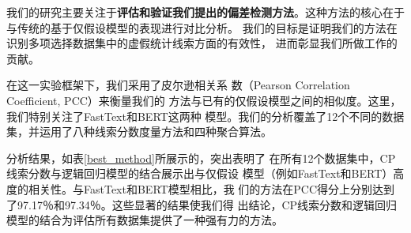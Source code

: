 %
我们的研究主要关注于\textbf{评估和验证我们提出的偏差检测方法}。这种方法的核心在于与传统的基于仅假设模型的表现进行对比分析。
我们的目标是证明我们的方法在识别多项选择数据集中的虚假统计线索方面的有效性，
进而彰显我们所做工作的贡献。

在这一实验框架下，我们采用了皮尔逊相关系
数（Pearson Correlation Coefficient, PCC）来衡量我们的
方法与已有的仅假设模型之间的相似度。这里，我们特别关注了FastText和BERT这两种
模型。我们的分析覆盖了12个不同的数据集，并运用了八种线索分数度量方法和四种聚合算法。

分析结果，如表\ref{best_method}所展示的，突出表明了
在所有12个数据集中，CP线索分数与逻辑回归模型的结合展示出与仅假设
模型（例如FastText和BERT）高度的相关性。与FastText和BERT模型相比，我
们的方法在PCC得分上分别达到了97.17％和97.34％。这些显著的结果使我们得
出结论，CP线索分数和逻辑回归模型的结合为评估所有数据集提供了一种强有力的方法。

